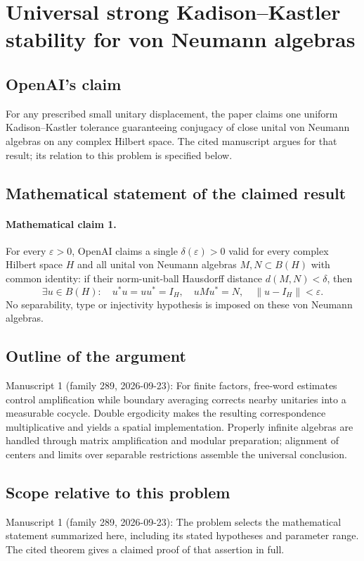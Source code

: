 \documentclass[11pt]{article}
\begin{document}
\section*{Universal strong Kadison–Kastler stability for von Neumann algebras}

\subsection{OpenAI's claim}
For any prescribed small unitary displacement, the paper claims one uniform Kadison--Kastler tolerance guaranteeing conjugacy of close unital von Neumann algebras on any complex Hilbert space. The cited manuscript argues for that result; its relation to this problem is specified below.

\subsection{Mathematical statement of the claimed result}
\paragraph{Mathematical claim 1.} For every $\varepsilon>0$, OpenAI claims a single $\delta(\varepsilon)>0$ valid for every complex Hilbert space $H$ and all unital von Neumann algebras $M,N\subset B(H)$ with common identity: if their norm-unit-ball Hausdorff distance $d(M,N)<\delta$, then
\[
\exists u\in B(H):\quad u^*u=uu^*=I_H,\quad uMu^*=N,\quad\|u-I_H\|<\varepsilon.
\]
No separability, type or injectivity hypothesis is imposed on these von Neumann algebras.

\subsection{Outline of the argument}
Manuscript 1 (family 289, 2026-09-23): For finite factors, free-word estimates control amplification while boundary averaging corrects nearby unitaries into a measurable cocycle. Double ergodicity makes the resulting correspondence multiplicative and yields a spatial implementation. Properly infinite algebras are handled through matrix amplification and modular preparation; alignment of centers and limits over separable restrictions assemble the universal conclusion.

\subsection{Scope relative to this problem}
Manuscript 1 (family 289, 2026-09-23): The problem selects the mathematical statement summarized here, including its stated hypotheses and parameter range. The cited theorem gives a claimed proof of that assertion in full.
\end{document}
